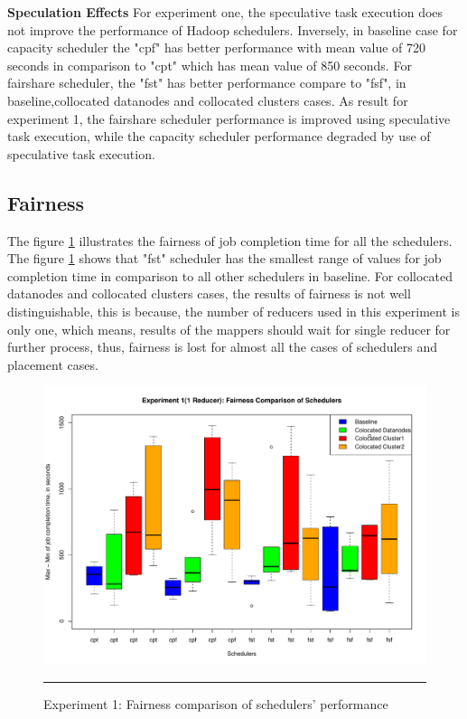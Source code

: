 \textbf{Speculation Effects }  For experiment one,  the speculative task execution does not improve the performance of Hadoop schedulers. Inversely, in baseline case for capacity scheduler the "cpf"‌ has better performance with mean value of 720 seconds in comparison to "cpt" which has mean value of 850 seconds. For fairshare scheduler, the "fst" has better performance compare to "fsf", in baseline,collocated datanodes and collocated clusters cases. As result for experiment 1,  the fairshare scheduler performance is improved using speculative task execution, while the capacity scheduler performance degraded by use of speculative task execution.   





\subsection{Fairness }

The figure \ref{fig:exp_1_max-min} illustrates the fairness of job completion time for all the schedulers. The figure \ref{fig:exp_1_max-min} shows that "fst" scheduler has the smallest range of values for job completion time in comparison to all other schedulers in baseline. For collocated datanodes and collocated clusters cases, the results of fairness is not well distinguishable, this is because, the number of reducers used in this experiment is only one, which means, results of the mappers should wait for single reducer for further process, thus, fairness is lost for almost all the cases of schedulers and placement cases.    

 \begin{figure}[htbp]
  \centering
    \includegraphics[width=\textwidth,height=\textheight,keepaspectratio]{./Figures/exp_1_max-min.pdf}
    \rule{35em}{0.5pt}
  \caption{Experiment 1: Fairness comparison of schedulers' performance }
  \label{fig:exp_1_max-min}
\end{figure} 
  

